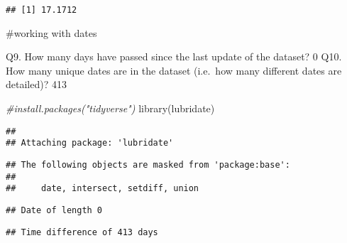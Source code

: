 \documentclass[
]{article}
\newenvironment{Shaded}{\begin{snugshade}}{\end{snugshade}}
\newcommand{\CommentTok}[1]{\textcolor[rgb]{0.56,0.35,0.01}{\textit{#1}}}
\newcommand{\DecValTok}[1]{\textcolor[rgb]{0.00,0.00,0.81}{#1}}
\newcommand{\FunctionTok}[1]{\textcolor[rgb]{0.00,0.00,0.00}{#1}}
\newcommand{\NormalTok}[1]{#1}
\newcommand{\OtherTok}[1]{\textcolor[rgb]{0.56,0.35,0.01}{#1}}
\newcommand{\SpecialCharTok}[1]{\textcolor[rgb]{0.00,0.00,0.00}{#1}}
\begin{document}
\begin{verbatim}
## [1] 17.1712
\end{verbatim}

\#working with dates

Q9. How many days have passed since the last update of the dataset? 0
Q10. How many unique dates are in the dataset (i.e.~how many different
dates are detailed)? 413

\begin{Shaded}
\begin{Highlighting}[]
\CommentTok{\#install.packages("tidyverse")}
\FunctionTok{library}\NormalTok{(lubridate)}
\end{Highlighting}
\end{Shaded}

\begin{verbatim}
## 
## Attaching package: 'lubridate'
\end{verbatim}

\begin{verbatim}
## The following objects are masked from 'package:base':
## 
##     date, intersect, setdiff, union
\end{verbatim}

\begin{Shaded}
\end{Shaded}

\begin{verbatim}
## Date of length 0
\end{verbatim}

\begin{Shaded}
\end{Shaded}

\begin{verbatim}
## Time difference of 413 days
\end{verbatim}
\end{document}
